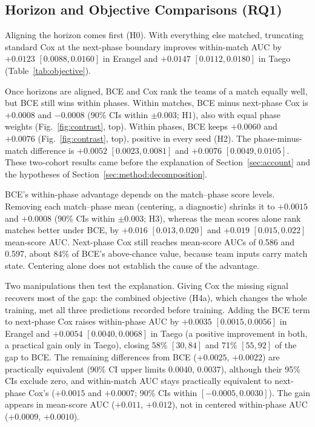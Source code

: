 \documentclass[sigconf,anonymous]{acmart}
\begin{document}
\subsection{Horizon and Objective Comparisons (RQ1)}
\label{sec:results:rq1}

Aligning the horizon comes first (H0). With everything else matched, truncating standard Cox at the next-phase boundary improves within-match AUC by $+0.0123$ $[0.0088,\allowbreak 0.0160]$ in Erangel and $+0.0147$ $[0.0112,\allowbreak 0.0180]$ in Taego (Table~\ref{tab:objective}).

Once horizons are aligned, BCE and Cox rank the teams of a match equally well, but BCE still wins within phases. Within matches, BCE minus next-phase Cox is $+0.0008$ and $-0.0008$ (90\% CIs within $\pm0.003$; H1), also with equal phase weights (Fig.~\ref{fig:contrast}, top). Within phases, BCE keeps $+0.0060$ and $+0.0076$ (Fig.~\ref{fig:contrast}, top), positive in every seed (H2). The phase-minus-match difference is $+0.0052$ $[0.0023,\allowbreak 0.0081]$ and $+0.0076$ $[0.0049,\allowbreak 0.0105]$. These two-cohort results came before the explanation of Section~\ref{sec:account} and the hypotheses of Section~\ref{sec:method:decomposition}.

BCE's within-phase advantage depends on the match--phase score levels. Removing each match--phase mean (centering, a diagnostic) shrinks it to $+0.0015$ and $+0.0008$ (90\% CIs within $\pm0.003$; H3), whereas the mean scores alone rank matches better under BCE, by $+0.016$ $[0.013,\allowbreak 0.020]$ and $+0.019$ $[0.015,\allowbreak 0.022]$ mean-score AUC. Next-phase Cox still reaches mean-score AUCs of 0.586 and 0.597, about 84\% of BCE's above-chance value, because team inputs carry match state. Centering alone does not establish the cause of the advantage.

Two manipulations then test the explanation. Giving Cox the missing signal recovers most of the gap: the combined objective (H4a), which changes the whole training, met all three predictions recorded before training. Adding the BCE term to next-phase Cox raises within-phase AUC by $+0.0035$ $[0.0015,\allowbreak 0.0056]$ in Erangel and $+0.0054$ $[0.0040,\allowbreak 0.0068]$ in Taego (a positive improvement in both, a practical gain only in Taego), closing 58\% $[30,\allowbreak 84]$ and 71\% $[55,\allowbreak 92]$ of the gap to BCE. The remaining differences from BCE ($+0.0025$, $+0.0022$) are practically equivalent (90\% CI upper limits 0.0040, 0.0037), although their 95\% CIs exclude zero, and within-match AUC stays practically equivalent to next-phase Cox's ($+0.0015$ and $+0.0007$; 90\% CIs within $[-0.0005,\allowbreak 0.0030]$). The gain appears in mean-score AUC ($+0.011$, $+0.012$), not in centered within-phase AUC ($+0.0009$, $+0.0010$).
\end{document}
